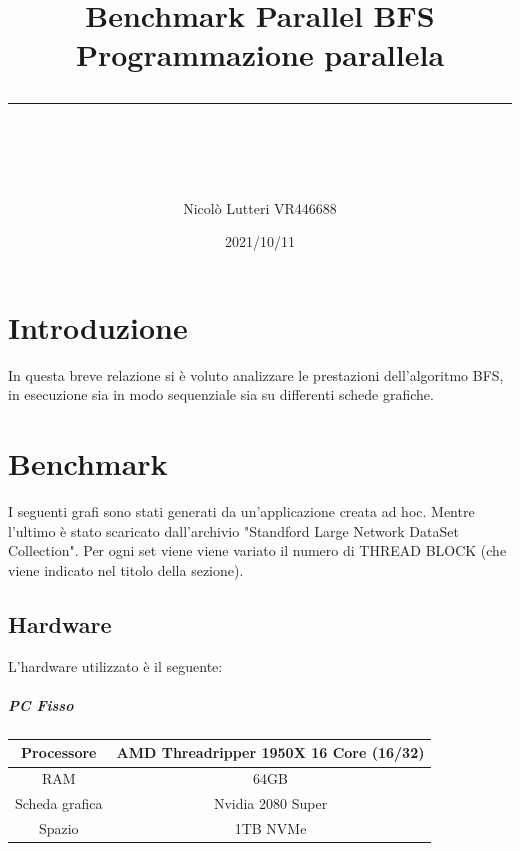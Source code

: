 \documentclass[12pt,a4paper]{report}
\begin{document}
	
	\title
	{
		\huge{Benchmark Parallel BFS} \\
		\normalsize{Programmazione parallela} \\
		\rule{\linewidth}{2pt} \\  
		[0.5cm] 
	}
	\author{Nicolò Lutteri VR446688}
	\date{2021/10/11}
	
	\maketitle
	
	\tableofcontents
	
	\chapter{Introduzione}
	
		In questa breve relazione si è voluto analizzare le prestazioni dell'algoritmo BFS, in esecuzione sia in modo sequenziale sia su differenti schede grafiche.
		
	\chapter{Benchmark}
	
		I seguenti grafi sono stati generati da un'applicazione creata ad hoc.
		Mentre l'ultimo è stato scaricato dall'archivio "Standford Large Network DataSet Collection".
		Per ogni set viene viene variato il numero di THREAD BLOCK (che viene indicato nel titolo della sezione).
		
		\section{Hardware}
		
		L'hardware utilizzato è il seguente:
		
		\paragraph{PC Fisso}
		
			\begin{tabular}{|c|c|}
				\hline
				Processore & AMD Threadripper 1950X 16 Core (16/32) \\
				\hline
				RAM & 64GB \\
				\hline
				Scheda grafica & Nvidia 2080 Super \\
				\hline
				Spazio & 1TB NVMe \\
				\hline
			\end{tabular}
			
\end{document}
